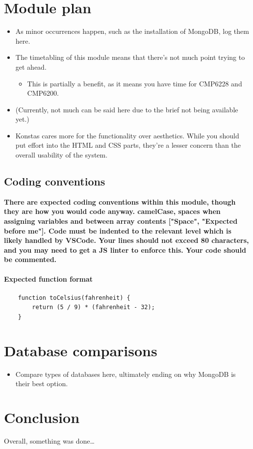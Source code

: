 \documentclass[12pt]{report}
\begin{document}
\chapter*{Module plan}
\begin{itemize}
    \item As minor occurrences happen, such as the installation of MongoDB, log them here.
    \item The timetabling of this module means that there's not much point trying to get ahead.
    \begin{itemize}
        \item This is partially a benefit, as it means you have time for CMP6228 and CMP6200.
    \end{itemize}
    \item (Currently, not much can be said here due to the brief not being available yet.)
    \item Konstas cares more for the functionality over aesthetics. While you should put effort into 
    the HTML and CSS parts, they're a lesser concern than the overall usability of the system.
\end{itemize}

\section*{Coding conventions}

\textbf{There are expected coding conventions within this module, though they are how you would 
code anyway. camelCase, spaces when assigning variables and between array contents ["Space", "Expected before me"].
Code must be indented to the relevant level which is likely handled by VSCode. Your lines should not exceed 
80 characters, and you may need to get a JS linter to enforce this. Your code should be commented.}

\vspace{10pt}

\subsubsection{Expected function format}

\begin{verbatim}
    function toCelsius(fahrenheit) {
        return (5 / 9) * (fahrenheit - 32);
    }
\end{verbatim}

\chapter{Database comparisons}
\begin{itemize}
    \item Compare types of databases here, ultimately ending on why MongoDB 
    is their best option.
\end{itemize}


\chapter*{Conclusion}

Overall, something was done\dots
\end{document}
